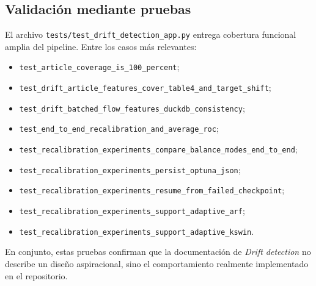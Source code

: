 \subsection{Validaci\'on mediante pruebas}
El archivo \texttt{tests/test\_drift\_detection\_app.py} entrega cobertura funcional amplia del pipeline. Entre los casos m\'as relevantes:
\begin{itemize}[leftmargin=*]
  \item \texttt{test\_article\_coverage\_is\_100\_percent};
  \item \texttt{test\_drift\_article\_features\_cover\_table4\_and\_target\_shift};
  \item \texttt{test\_drift\_batched\_flow\_features\_duckdb\_consistency};
  \item \texttt{test\_end\_to\_end\_recalibration\_and\_average\_roc};
  \item \texttt{test\_recalibration\_experiments\_compare\_balance\_modes\_end\_to\_end};
  \item \texttt{test\_recalibration\_experiments\_persist\_optuna\_json};
  \item \texttt{test\_recalibration\_experiments\_resume\_from\_failed\_checkpoint};
  \item \texttt{test\_recalibration\_experiments\_support\_adaptive\_arf};
  \item \texttt{test\_recalibration\_experiments\_support\_adaptive\_kswin}.
\end{itemize}

En conjunto, estas pruebas confirman que la documentaci\'on de \textit{Drift detection} no describe un dise\~no aspiracional, sino el comportamiento realmente implementado en el repositorio.
